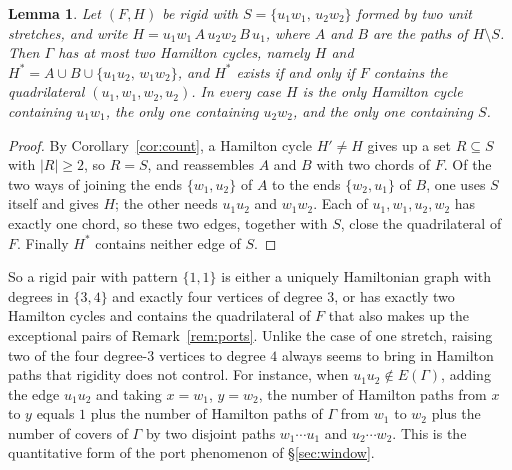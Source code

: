 \documentclass[11pt,a4paper]{article}
\newtheorem{lemma}[theorem]{Lemma}
\theoremstyle{definition}
\theoremstyle{remark}
\begin{document}
\begin{lemma}\label{lem:oneone}
Let $(F,H)$ be rigid with $S=\{u_1w_1,\,u_2w_2\}$ formed by two unit stretches, and write $H=u_1w_1\,A\,u_2w_2\,B\,u_1$, where $A$ and $B$ are the paths of $H\setminus S$. Then $\Gamma$ has at most two Hamilton cycles, namely $H$ and $H^*=A\cup B\cup\{u_1u_2,\,w_1w_2\}$, and $H^*$ exists if and only if $F$ contains the quadrilateral $(u_1,w_1,w_2,u_2)$. In every case $H$ is the only Hamilton cycle containing $u_1w_1$, the only one containing $u_2w_2$, and the only one containing $S$.
\end{lemma}

\begin{proof}
By Corollary~\ref{cor:count}, a Hamilton cycle $H'\ne H$ gives up a set $R\subseteq S$ with $|R|\ge2$, so $R=S$, and reassembles $A$ and $B$ with two chords of $F$. Of the two ways of joining the ends $\{w_1,u_2\}$ of $A$ to the ends $\{w_2,u_1\}$ of $B$, one uses $S$ itself and gives $H$; the other needs $u_1u_2$ and $w_1w_2$. Each of $u_1,w_1,u_2,w_2$ has exactly one chord, so these two edges, together with $S$, close the quadrilateral of $F$. Finally $H^*$ contains neither edge of $S$.
\end{proof}

So a rigid pair with pattern $\{1,1\}$ is either a uniquely Hamiltonian graph with degrees in $\{3,4\}$ and exactly four vertices of degree $3$, or has exactly two Hamilton cycles and contains the quadrilateral of $F$ that also makes up the exceptional pairs of Remark~\ref{rem:ports}. Unlike the case of one stretch, raising two of the four degree-$3$ vertices to degree $4$ always seems to bring in Hamilton paths that rigidity does not control. For instance, when $u_1u_2\notin E(\Gamma)$, adding the edge $u_1u_2$ and taking $x=w_1$, $y=w_2$, the number of Hamilton paths from $x$ to $y$ equals $1$ plus the number of Hamilton paths of $\Gamma$ from $w_1$ to $w_2$ plus the number of covers of $\Gamma$ by two disjoint paths $w_1\cdots u_1$ and $u_2\cdots w_2$. This is the quantitative form of the port phenomenon of \S\ref{sec:window}.
\end{document}
